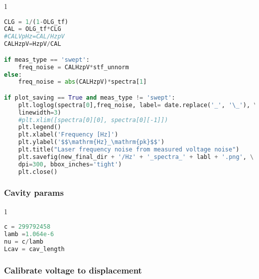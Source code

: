 \begin{spacing}{1}
\begin{lstlisting}[frame=single, language=Python]
CLG = 1/(1-OLG_tf)                                                           # Closed loop gain
CAL = OLG_tf*CLG                                                             # Loop gain calibration factor
#CALVpHz=CAL/HzpV                                                            # Calibrated voltage to frequency
CALHzpV=HzpV/CAL                                                             # Calibration factor using A(f) and OLG(f)

if meas_type == 'swept':                                                     # Calibrate data
    freq_noise = CALHzpV*stf_unnorm
else:
    freq_noise = abs(CALHzpV)*spectra[1]

if plot_saving == True and meas_type != 'swept':                             # if plotting spectra measurement this is plotting and saving the frequency noise if requested
    plt.loglog(spectra[0],freq_noise, label= date.replace('_', '\_'), \
    linewidth=3)
    #plt.xlim([spectra[0][0], spectra[0][-1]])
    plt.legend()
    plt.xlabel('Frequency [Hz]')
    plt.ylabel('$$\mathrm{Hz}_\mathrm{pk}$$')
    plt.title("Laser frequency noise from measured voltage noise")
    plt.savefig(new_final_dir + '/Hz' + '_spectra_' + labl + '.png', \
    dpi=300, bbox_inches='tight')
    plt.close()
\end{lstlisting} \end{spacing}

\subsubsection{Cavity params}\label{cavity-params}

\begin{spacing}{1} \begin{lstlisting}[frame=single, language=Python]
c = 299792458                                                                # Cavity parameters
lamb =1.064e-6
nu = c/lamb
Lcav = cav_length
\end{lstlisting} \end{spacing}

\subsubsection{Calibrate voltage to
displacement}\label{calibrate-voltage-to-displacement}

